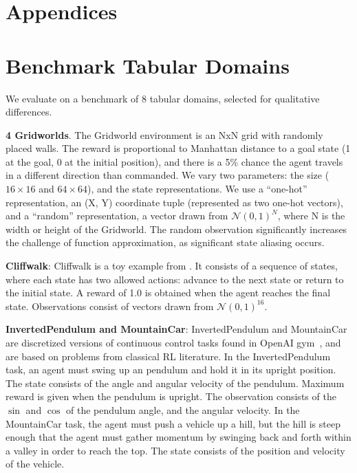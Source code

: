 \section*{Appendices}

\section{Benchmark Tabular Domains}
\label{app:domains}

We evaluate on a benchmark of 8 tabular domains, selected for qualitative differences.

\textbf{4 Gridworlds}. The Gridworld environment is an NxN grid with randomly placed walls. The reward is proportional to Manhattan distance to a goal state (1 at the goal, 0 at the initial position), and there is a 5\% chance the agent travels in a different direction than commanded. We vary two parameters: the size ($16 \times 16$ and $64 \times 64$), and the state representations. We use a ``one-hot'' representation, an (X, Y) coordinate tuple (represented as two one-hot vectors), and a ``random'' representation, a vector drawn from $\mathcal{N}(0, 1)^N$, where N is the width or height of the Gridworld. The random observation significantly increases the challenge of function approximation, as significant state aliasing occurs.

\textbf{Cliffwalk}: Cliffwalk is a toy example from \citet{Schaul2015}. It consists of a sequence of states, where each state has two allowed actions: advance to the next state or return to the initial state. A reward of 1.0 is obtained when the agent reaches the final state. Observations consist of vectors drawn from $\mathcal{N}(0, 1)^{16}$.

\textbf{InvertedPendulum and MountainCar}: InvertedPendulum and MountainCar are discretized versions of continuous control tasks found in OpenAI gym~\citep{gym}, and are based on problems from classical RL literature. 
In the InvertedPendulum task, an agent must swing up an pendulum and hold it in its upright position. The state consists of the angle and angular velocity of the pendulum. Maximum reward is given when the pendulum is upright. The observation consists of the $\sin$ and $\cos$ of the pendulum angle, and the angular velocity.
In the MountainCar task, the agent must push a vehicle up a hill, but the hill is steep enough that the agent must gather momentum by swinging back and forth within a valley in order to reach the top. The state consists of the position and velocity of the vehicle.

